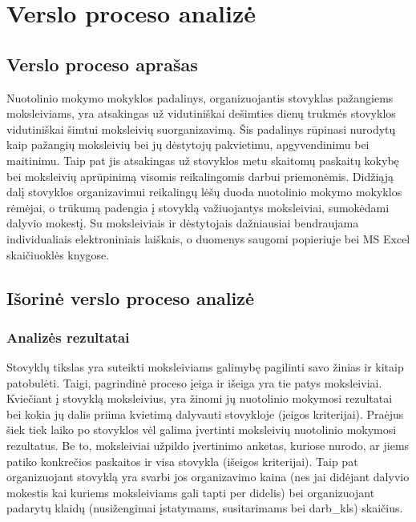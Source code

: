 \chapter{Verslo proceso analizė}

\section{Verslo proceso aprašas}

Nuotolinio mokymo mokyklos padalinys, organizuojantis stovyklas pažangiems
moksleiviams, yra atsakingas už vidutiniškai dešimties dienų trukmės
stovyklos vidutiniškai šimtui moksleivių suorganizavimą. Šis padalinys
rūpinasi nurodytų kaip pažangių moksleivių bei jų dėstytojų pakvietimu, 
apgyvendinimu bei maitinimu. Taip pat jis atsakingas už stovyklos metu 
skaitomų paskaitų kokybę bei moksleivių aprūpinimą visomis reikalingomis
darbui priemonėmis. Didžiąją dalį stovyklos organizavimui reikalingų lėšų
duoda nuotolinio mokymo mokyklos rėmėjai, o trūkumą padengia į stovyklą
važiuojantys moksleiviai, sumokėdami dalyvio mokestį. Su moksleiviais ir
dėstytojais dažniausiai bendraujama individualiais elektroniniais 
laiškais, o duomenys saugomi popieriuje bei MS Excel skaičiuoklės knygose.

\section{Išorinė verslo proceso analizė}

\subsection{Analizės rezultatai}

Stovyklų tikslas yra suteikti moksleiviams galimybę pagilinti
savo žinias ir kitaip patobulėti. Taigi, pagrindinė proceso įeiga ir išeiga
yra tie patys moksleiviai. Kviečiant į stovyklą moksleivius, yra
žinomi jų nuotolinio mokymosi rezultatai bei kokia jų dalis priima 
kvietimą dalyvauti stovykloje (įeigos kriterijai). Praėjus šiek tiek
laiko po stovyklos vėl galima įvertinti moksleivių nuotolinio
mokymosi rezultatus. Be to, moksleiviai užpildo įvertinimo anketas, kuriose
nurodo, ar jiems patiko konkrečios paskaitos ir visa stovykla
(išeigos kriterijai). Taip pat organizuojant stovyklą yra svarbi jos 
organizavimo kaina (nes jai didėjant dalyvio mokestis kai kuriems 
moksleiviams gali tapti per didelis) bei organizuojant padarytų klaidų
(nusižengimai įstatymams, susitarimams bei \glspl{darb_kl}) skaičius. 

